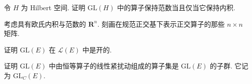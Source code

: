\documentclass[../../main.tex]{subfiles}
\begin{document}
\begin{exercise}\label{exercise:ch22-09}
令 $H$ 为 Hilbert 空间. 证明 $\mathrm{GL}(H)$ 中的算子保持范数当且仅当它保持内积.
\end{exercise}

\begin{exercise}\label{exercise:ch22-10}
考虑具有欧氏内积与范数的 $\mathbf{R}^{n}$. 刻画在规范正交基下表示正交算子的那些 $n\times n$ 矩阵.
\end{exercise}

\begin{exercise}\label{exercise:ch22-11}
证明 $\mathrm{GL}(E)$ 在 $\mathcal{L}(E)$ 中是开的.
\end{exercise}

\begin{exercise}\label{exercise:ch22-12}
证明 $\mathrm{GL}(E)$ 中由恒等算子的线性紧扰动组成的算子集是 $\mathrm{GL}(E)$ 的子群. 它记为 $\mathrm{GL}_{C}(E)$.
\end{exercise}
\end{document}
